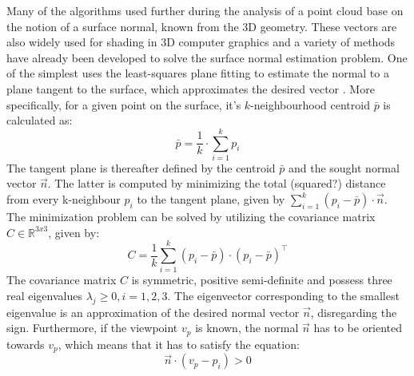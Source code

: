 
Many of the algorithms used further during the analysis of a point cloud base on the notion of a surface normal, known from the 3D geometry. These vectors are also widely used for shading in 3D computer graphics and a variety of methods have already been developed to solve the surface normal estimation problem. One of the simplest uses the least-squares plane fitting to estimate the normal to a plane tangent to the surface, which approximates the desired vector \cite{rusuthesis}. More specifically, for a given point on the surface, it's $k$-neighbourhood centroid $\bar{p}$ is calculated as:
\begin{equation} 
\bar{p} = \frac{1}{k} \cdot \sum\limits_{i=1}^{k} p_i 
\end{equation}
The tangent plane is thereafter defined by the centroid $\bar{p}$ and the sought normal vector $\vec{n}$. The latter is computed by minimizing the total (squared?) distance from every k-neighbour $p_i$ to the tangent plane, given by $\sum\limits_{i=1}^{k} (p_i - \bar{p})\cdot \vec{n}$. The minimization problem can be solved by utilizing the covariance matrix $C \in \mathbb{R}^{3x3}$, given by:
\begin{equation}
C = \frac{1}{k}\sum\limits_{i=1}^{k}(p_i - \bar{p})\cdot (p_i - \bar{p})^\intercal
\end{equation}
The covariance matrix $C$ is symmetric, positive semi-definite and possess three real eigenvalues $\lambda_j \geq 0, i = 1,2,3$. The eigenvector corresponding to the smallest eigenvalue is an approximation of the desired normal vector $\vec{n}$, disregarding the sign. Furthermore, if the viewpoint $v_p$ is known, the normal $\vec{n}$ has to be oriented towards  $v_p$, which means that it has to satisfy the equation:
\begin{equation}
\vec{n}\cdot(v_p-p_i) > 0
\end{equation}

